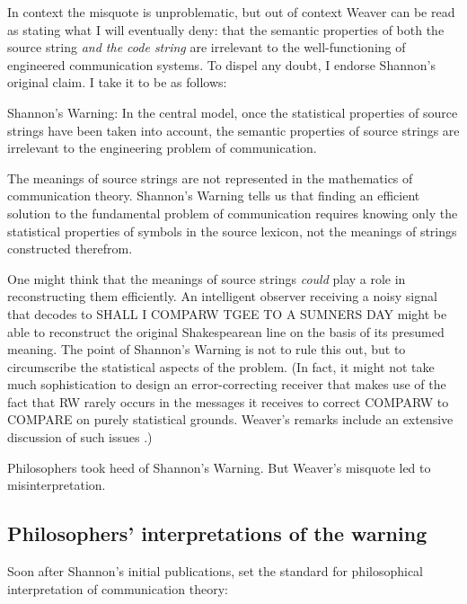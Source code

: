 \documentclass[12pt]{article}
\begin{document}
In context the misquote is unproblematic, but out of context Weaver can be read as stating what I will eventually deny: that the semantic properties of both the source string \textit{and the code string} are irrelevant to the well-functioning of engineered communication systems.
To dispel any doubt, I endorse Shannon's original claim.
I take it to be as follows:

\begin{myquote}
{\sc Shannon's Warning}: In the central model, once the statistical properties of source strings have been taken into account, the semantic properties of source strings are irrelevant to the engineering problem of communication.
\end{myquote}

\noindent The meanings of source strings are not represented in the mathematics of communication theory.
{\sc Shannon's Warning} tells us that finding an efficient solution to the fundamental problem of communication requires knowing only the statistical properties of symbols in the source lexicon, not the meanings of strings constructed therefrom.

One might think that the meanings of source strings \emph{could} play a role in reconstructing them efficiently.
An intelligent observer receiving a noisy signal that decodes to {\sc SHALL I COMPARW TGEE TO A SUMNERS DAY} might be able to reconstruct the original Shakespearean line on the basis of its presumed meaning.
The point of {\sc Shannon's Warning} is not to rule this out, but to circumscribe the statistical aspects of the problem.
(In fact, it might not take much sophistication to design an error-correcting receiver that makes use of the fact that {\sc RW} rarely occurs in the messages it receives to correct {\sc COMPARW} to {\sc COMPARE} on purely statistical grounds.
Weaver's remarks include an extensive discussion of such issues \citep[$\S$2]{shannon1949mathematical}.)

Philosophers took heed of {\sc Shannon's Warning}.
But Weaver's misquote led to misinterpretation.

\subsection{Philosophers' interpretations of the warning}\label{subsec:warningPhil}

Soon after Shannon's initial publications, \citet{bar-hillel1953semantic} set the standard for philosophical interpretation of communication theory:
\end{document}
